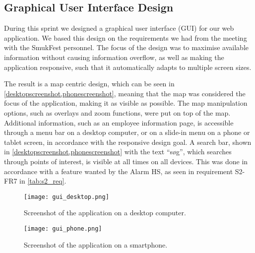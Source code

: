 \subsection{Graphical User Interface Design} \label{sec:s2_gui}

During this sprint we designed a graphical user interface (GUI) for our web application. We based this design on the requirements we had from the meeting with the SmukFest personnel. The focus of the design was to maximise available information without causing information overflow, as well as making the application responsive, such that it automatically adapts to multiple screen sizes. 

The result is a map centric design, which can be seen in \cref{desktopscreenshot,phonescreenshot}, meaning that the map was considered the focus of the application, making it as visible as possible. The map manipulation options, such as overlays and zoom functions, were put on top of the map. Additional information, such as an employee information page, is accessible through a menu bar on a desktop computer, or on a slide-in menu on a phone or tablet screen, in accordance with the responsive design goal. A search bar, shown in \cref{desktopscreenshot,phonescreenshot} with the text \enquote{søg}, which searches through points of interest, is visible at all times on all devices. This was done in accordance with a feature wanted by the Alarm HS, as seen in requirement S2-FR7 in \cref{tab:s2_req}.

\begin{figure}[htbp]
    \centering
\texttt{[image: gui\_desktop.png]}
\caption{Screenshot of the application on a desktop computer.}
\label{desktopscreenshot}
\end{figure}
\begin{figure}[htbp]
    \centering
\texttt{[image: gui\_phone.png]}
\caption{Screenshot of the application on a smartphone.}
\label{phonescreenshot}
\end{figure}